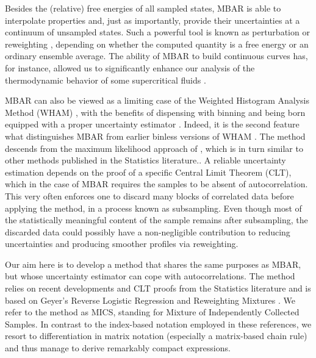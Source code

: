 \documentclass[journal=jctcce,manuscript=article,layout=twocolumn]{achemso}
\begin{document}
Besides the (relative) free energies of all sampled states, MBAR is able to interpolate properties and, just as importantly, provide their uncertainties at a continuum of unsampled states. Such a powerful tool is known as perturbation \cite{Zwanzig_1954} or reweighting \cite{McDonald_1967, McDonald_1969}, depending on whether the computed quantity is a free energy or an ordinary ensemble average. The ability of MBAR to build continuous curves has, for instance, allowed us to significantly enhance our analysis of the thermodynamic behavior of some supercritical fluids \cite{Aimoli_2014, Aimoli_2014_2, Nichele_2018}.

MBAR can also be viewed as a limiting case of the Weighted Histogram Analysis Method (WHAM) \cite{Kumar_1992}, with the benefits of dispensing with binning \cite{Tan_2012} and being born equipped with a proper uncertainty estimator \cite{Shirts_2008}. Indeed, it is the second feature what distinguishes MBAR from earlier binless versions of WHAM \cite{Bartels_2000, Souaille_2001}. The method descends from the maximum likelihood approach of \citeauthor{Kong_2003} \cite{Kong_2003}, which is in turn similar to other methods published in the Statistics literature.\cite{Vardi_1985, Gill_1988, Geyer_1994, Lindsay_1995, Meng_1996}. A reliable uncertainty estimation depends on the proof of a specific Central Limit Theorem (CLT), which in the case of MBAR requires the samples to be absent of autocorrelation. This very often enforces one to discard many blocks of correlated data before applying the method, in a process known as subsampling. Even though most of the statistically meaningful content of the sample remains after subsampling, the discarded data could possibly have a non-negligible contribution to reducing uncertainties and producing smoother profiles via reweighting.

Our aim here is to develop a method that shares the same purposes as MBAR, but whose uncertainty estimator can cope with autocorrelations. The method relies on recent developments and CLT proofs from the Statistics literature\cite{Flegal_2010, Buta_2010, Buta_2011, Doss_2014, Vats_2015, Tan_2015, Roy_2018} and is based on Geyer's Reverse Logistic Regression and Reweighting Mixtures \cite{Geyer_1994}. We refer to the method as MICS, standing for Mixture of Independently Collected Samples. In contrast to the index-based notation employed in these references, we resort to differentiation in matrix notation (especially a matrix-based chain rule) and thus manage to derive remarkably compact expressions.
\end{document}
